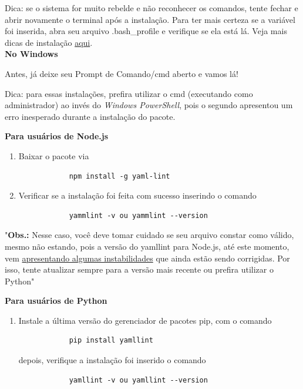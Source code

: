 Dica: se o sistema for muito rebelde e não reconhecer os comandos, tente fechar e abrir novamente o terminal após a instalação. Para ter mais certeza se a variável foi inserida, abra seu arquivo .bash\_profile e verifique se ela está lá. Veja mais dicas de instalação \href{https://livreeaberto.com/homebrew-linux}{aqui}. \\

\textbf{No Windows}

Antes, já deixe seu Prompt de Comando/cmd aberto e vamos lá!

Dica: para essas instalações, prefira utilizar o \acs{cmd} (executando como administrador) ao invés do \textit{Windows PowerShell}, pois o segundo apresentou um erro inesperado durante a instalação do pacote.

\textbf{Para usuários de Node.js}
\begin{enumerate}
  \item Baixar o pacote via 
    \lstset{language=Fortran,
             basicstyle=\ttfamily\small,
             showstringspaces=false
    }
        \begin{lstlisting} 
            npm install -g yaml-lint
        \end{lstlisting}
  \item Verificar se a instalação foi feita com sucesso inserindo o comando
    \lstset{language=Fortran,
             basicstyle=\ttfamily\small,
             showstringspaces=false
    }
        \begin{lstlisting} 
            yammlint -v ou yammlint --version
        \end{lstlisting}  
\end{enumerate}

"\textbf{Obs.:} Nesse caso, você deve tomar cuidado se seu arquivo constar como válido, mesmo não estando, pois a versão do yamllint para \gls{Node.js}, até este momento, vem \href{https://github.com/rasshofer/yaml-lint/issues/31}{apresentando algumas instabilidades} que ainda estão sendo corrigidas. Por isso, tente atualizar sempre para a versão mais recente ou prefira utilizar o \gls{Python}"

\textbf{Para usuários de Python}
\begin{enumerate}
  \item Instale a última versão do gerenciador de pacotes pip, com o comando
    \lstset{language=Fortran,
             basicstyle=\ttfamily\small,
             showstringspaces=false
    }
        \begin{lstlisting} 
            pip install yamllint
        \end{lstlisting}
        depois, verifique a instalação foi inserido o comando
    \lstset{language=Fortran,
             basicstyle=\ttfamily\small,
             showstringspaces=false
    }
        \begin{lstlisting} 
            yamllint -v ou yamllint --version
        \end{lstlisting}
\end{enumerate}

